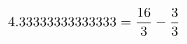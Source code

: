 \documentclass[preview]{standalone}
\begin{document}
\begin{align*}
\special{dvisvgm:raw <g id='unique000'>}4.33333333333333 = \frac{16}{3} - \frac{3}{3}\special{dvisvgm:raw </g>}
\end{align*}
\end{document}

